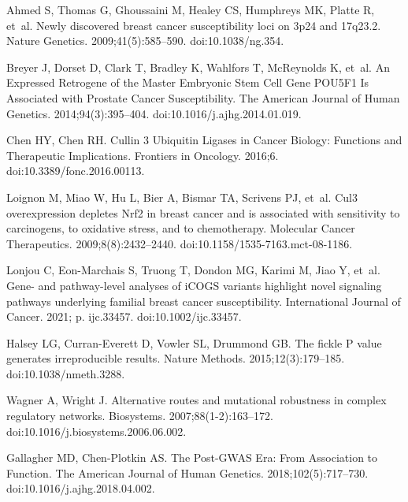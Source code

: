 \documentclass[10pt,letterpaper]{article}
\begin{document}
\begin{thebibliography}{10}
  Ahmed S, Thomas G, Ghoussaini M, Healey CS, Humphreys MK, Platte R, et~al.
  \newblock Newly discovered breast cancer susceptibility loci on 3p24 and
    17q23.2.
  \newblock Nature Genetics. 2009;41(5):585--590.
  \newblock doi:{10.1038/ng.354}.
  
  Breyer J, Dorset D, Clark T, Bradley K, Wahlfors T, McReynolds K, et~al.
  \newblock An {Expressed} {Retrogene} of the {Master} {Embryonic} {Stem} {Cell}
    {Gene} {POU}5F1 {Is} {Associated} with {Prostate} {Cancer} {Susceptibility}.
  \newblock The American Journal of Human Genetics. 2014;94(3):395--404.
  \newblock doi:{10.1016/j.ajhg.2014.01.019}.
  
  Chen HY, Chen RH.
  \newblock Cullin 3 Ubiquitin Ligases in Cancer Biology: Functions and
    Therapeutic Implications.
  \newblock Frontiers in Oncology. 2016;6.
  \newblock doi:{10.3389/fonc.2016.00113}.
  
  Loignon M, Miao W, Hu L, Bier A, Bismar TA, Scrivens PJ, et~al.
  \newblock Cul3 overexpression depletes Nrf2 in breast cancer and is associated
    with sensitivity to carcinogens, to oxidative stress, and to chemotherapy.
  \newblock Molecular Cancer Therapeutics. 2009;8(8):2432--2440.
  \newblock doi:{10.1158/1535-7163.mct-08-1186}.
  
  Lonjou C, Eon-Marchais S, Truong T, Dondon MG, Karimi M, Jiao Y, et~al.
  \newblock Gene- and pathway-level analyses of {iCOGS} variants highlight novel
    signaling pathways underlying familial breast cancer susceptibility.
  \newblock International Journal of Cancer. 2021; p. ijc.33457.
  \newblock doi:{10.1002/ijc.33457}.
  
  Halsey LG, Curran-Everett D, Vowler SL, Drummond GB.
  \newblock The fickle {P} value generates irreproducible results.
  \newblock Nature Methods. 2015;12(3):179--185.
  \newblock doi:{10.1038/nmeth.3288}.
  
  Wagner A, Wright J.
  \newblock Alternative routes and mutational robustness in complex regulatory
    networks.
  \newblock Biosystems. 2007;88(1-2):163--172.
  \newblock doi:{10.1016/j.biosystems.2006.06.002}.
  
  Gallagher MD, Chen-Plotkin AS.
  \newblock The {Post}-{GWAS} {Era}: {From} {Association} to {Function}.
  \newblock The American Journal of Human Genetics. 2018;102(5):717--730.
  \newblock doi:{10.1016/j.ajhg.2018.04.002}.
  

\end{thebibliography}
\end{document}
